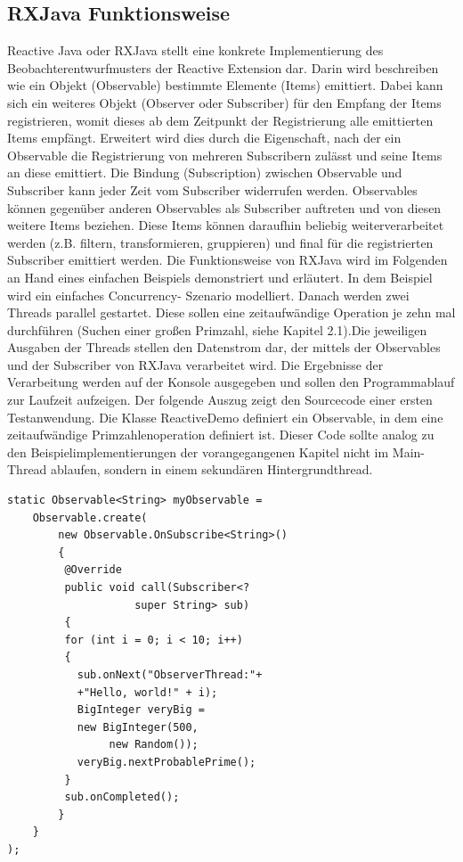 \documentclass[12pt,oneside,a4paper,bibtotoc,liststotoc]{scrreprt}
\begin{document}
\subsection{RXJava Funktionsweise}
Reactive Java oder RXJava stellt eine konkrete Implementierung des Beobachterentwurfmusters der Reactive Extension dar. Darin wird beschreiben wie ein Objekt (Observable) bestimmte Elemente (Items) emittiert. Dabei kann sich ein weiteres Objekt (Observer oder Subscriber) für den Empfang der Items registrieren, womit dieses ab dem Zeitpunkt der Registrierung alle emittierten Items empfängt. Erweitert wird dies durch die Eigenschaft, nach der ein Observable die Registrierung von mehreren Subscribern zulässt und seine Items an diese emittiert. Die Bindung (Subscription) zwischen Observable und Subscriber kann jeder Zeit vom Subscriber widerrufen werden. Observables können gegenüber anderen Observables als Subscriber auftreten und von diesen weitere Items beziehen. Diese Items können daraufhin beliebig weiterverarbeitet werden (z.B. filtern, transformieren, gruppieren) und final für die registrierten Subscriber emittiert werden.\newline
Die Funktionsweise von RXJava wird im Folgenden an Hand eines einfachen Beispiels demonstriert und erläutert. In dem Beispiel wird ein einfaches Concurrency- Szenario modelliert. Danach werden zwei Threads parallel gestartet. Diese sollen eine zeitaufwändige Operation je zehn mal durchführen (Suchen einer großen Primzahl, siehe Kapitel 2.1).Die jeweiligen Ausgaben der Threads stellen den Datenstrom dar, der mittels der Observables und der Subscriber von RXJava verarbeitet wird. Die Ergebnisse der Verarbeitung werden auf der Konsole ausgegeben und sollen den Programmablauf zur Laufzeit aufzeigen. Der folgende Auszug zeigt den Sourcecode einer ersten Testanwendung. Die Klasse ReactiveDemo definiert ein Observable, in dem eine zeitaufwändige Primzahlenoperation definiert ist. Dieser Code sollte analog zu den Beispielimplementierungen der vorangegangenen Kapitel nicht im Main- Thread ablaufen, sondern in einem sekundären Hintergrundthread.\newline
\begin{lstlisting}
static Observable<String> myObservable = 
	Observable.create(
		new Observable.OnSubscribe<String>() 
		{
		 @Override
		 public void call(Subscriber<? 
           			super String> sub) 
		 {
		 for (int i = 0; i < 10; i++)
		 {
		   sub.onNext("ObserverThread:"+ 
		   +"Hello, world!" + i);
		   BigInteger veryBig = 
		   new BigInteger(500, 
				new Random());
		   veryBig.nextProbablePrime();
		 }
		 sub.onCompleted();
		}
    }
);
\end{lstlisting}
\end{document}
